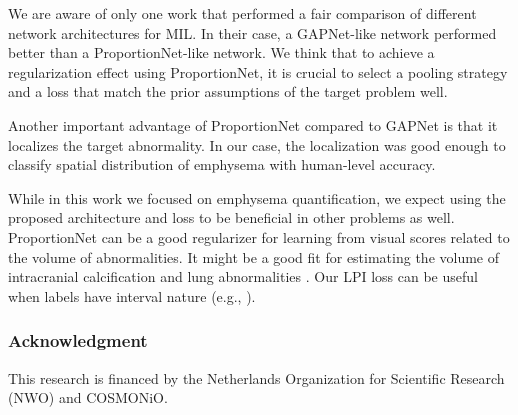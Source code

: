 \documentclass{llncs}
\begin{document}
We are aware of only one work \cite{Wang2018} that performed a fair comparison of different network architectures for MIL.
In their case, a GAPNet-like network performed better than a ProportionNet-like network.
We think that to achieve a regularization effect using ProportionNet, it is crucial to select a pooling strategy and a loss that match the prior assumptions of the target problem well.

Another important advantage of ProportionNet compared to GAPNet is that it localizes the target abnormality.
In our case, the localization was good enough to classify spatial distribution of emphysema with human-level accuracy.

While in this work we focused on emphysema quantification, we expect using the proposed architecture and loss to be beneficial in other problems as well. ProportionNet can be a good regularizer for learning from visual scores related to the volume of abnormalities.
It might be a good fit for estimating the volume of intracranial calcification \cite{bos2014} and lung abnormalities \cite{cystic2007}.
Our LPI loss can be useful when labels have interval nature (e.g., \cite{cystic2007}).

\subsubsection{Acknowledgment}

This research is financed by the Netherlands Organization for Scientific Research (NWO) and COSMONiO.


\end{document}
